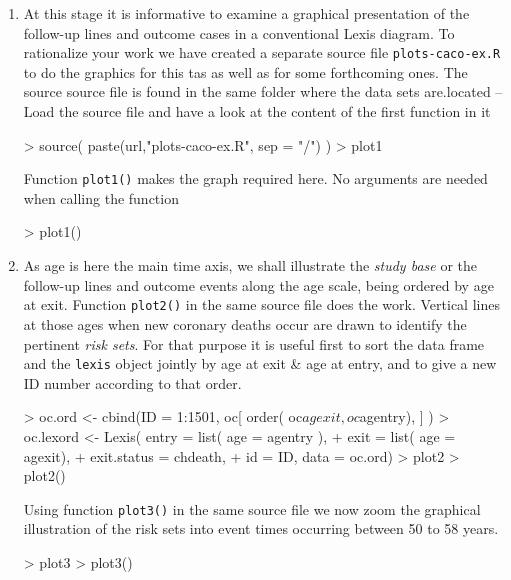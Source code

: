 \begin{enumerate}[resume]
\item
At this stage it is informative to examine a graphical
presentation of the follow-up lines and outcome cases in a conventional 
Lexis diagram. To rationalize your work we have created a separate source file
{\tt plots-caco-ex.R} to do the graphics for this tas as well as for some forthcoming ones. 
The source source file is found in the same folder %
where the data sets are.located -- Load the source file and have a look at the content of the first function in it
\begin{Schunk}
\begin{Sinput}
> source( paste(url,"plots-caco-ex.R", sep = "/") )
> plot1
\end{Sinput}
\end{Schunk}
Function {\tt plot1()} makes the graph required here. No arguments are needed when calling the function
\begin{Schunk}
\begin{Sinput}
> plot1()
\end{Sinput}
\end{Schunk}

\item
As age is here the main time axis, 
we shall illustrate the {\it study base} 
or the follow-up lines and outcome events 
along the age scale, being ordered by age at exit.
Function {\tt plot2()} in the same source file does the work.
Vertical lines at those ages when new coronary
deaths occur are drawn to identify the pertinent
{\it risk sets}. For that purpose it is useful first 
 to sort the data frame and the {\tt lexis} object 
 jointly by age at exit \& age at entry, 
 and to give a new ID number according to that order.
\begin{Schunk}
\begin{Sinput}
> oc.ord <- cbind(ID = 1:1501, oc[ order( oc$agexit, oc$agentry), ] )  
> oc.lexord <- Lexis( entry = list( age = agentry ), 
+                      exit = list( age = agexit),
+               exit.status = chdeath,
+                        id = ID, data = oc.ord)
> plot2
> plot2()
\end{Sinput}
\end{Schunk}

Using function {\tt plot3()} in the same source file we now
 zoom the graphical illustration of the risk sets into
event times occurring between 50 to 58 years.
\begin{Schunk}
\begin{Sinput}
> plot3
> plot3()
\end{Sinput}
\end{Schunk}

\end{enumerate} %

